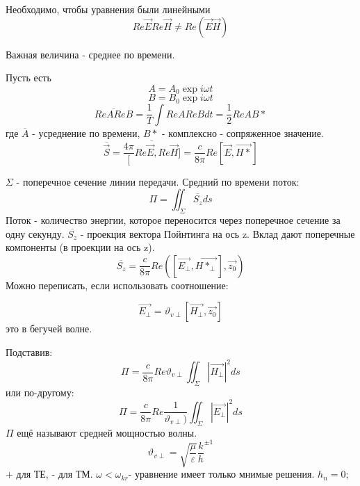 Необходимо, чтобы уравнения были линейными
\begin{equation}
	Re{\vec{E}} Re{\vec{H}} \neq Re{(\vec{E} \vec{H})}
\end{equation}

Важная величина - среднее по времени.

Пусть есть
\begin{equation}
	A = A_0 \exp{i \omega t}
\end{equation}
\begin{equation}
	B = B_0 \exp{i \omega t}
\end{equation}
\begin{equation}
	\overline{Re{A}Re{B}} = \frac{1}{T} \int{Re{A}Re{B}}dt = \frac{1}{2} Re{A B*}
\end{equation}
где $\overline{A}$ - усреднение по времени, $B*$ - комплексно - сопряженное значение.
\begin{equation}
	\overline{\vec{S}} = \overline{\frac{4 \pi} [Re{\vec{E}}, Re{\vec{H}}]} = \frac{c}{8 \pi} Re[\vec{E}, \vec{H*}]
\end{equation}

 $\Sigma$ -  поперечное сечение линии передачи. 
Средний по времени поток:
\begin{equation}
	\Pi = \iint_{\Sigma} \overline{S_z} ds
\end{equation}
Поток - количество энергии, которое переносится через поперечное сечение за одну секунду.
$\overline{S_z}$ - проекция вектора Пойнтинга на ось z.
Вклад дают поперечные компоненты (в проекции на ось z).
\begin{equation}
	\overline{S_z} = \frac{c}{8 \pi} Re([\vec{E_\perp}, \vec{H*_\perp}], \vec{z_0})
\end{equation}
Можно переписать, если использовать соотношение:

\begin{equation}
	\vec{E_\perp} = \vartheta_{v \perp} [\vec{H_\perp}, \vec{z_0}]
\end{equation}
это в бегучей волне.

Подставив:
\begin{equation}
	\Pi = \frac{c}{8 \pi} Re{\vartheta_{v \perp}} \iint_{\Sigma} |\vec{H_\perp}|^2 ds
\end{equation}
или по-другому:
\begin{equation}
	\Pi = \frac{c}{8 \pi} 
		Re{\frac{1}{\vartheta_{v \perp})}} \iint_{\Sigma} |\vec{E_\perp}|^2 ds
\end{equation}
$\Pi$ ещё называют средней мощностью волны.
\begin{equation}
	\vartheta_{v \perp} = \sqrt{\frac{\mu}{\varepsilon}} {\frac{k}{h}}^{\pm 1}
\end{equation}
+ для ТЕ, - для ТМ.
$\omega < \omega_{kr}$- уравнение имеет только мнимые решения.
$h_n = 0$; 

